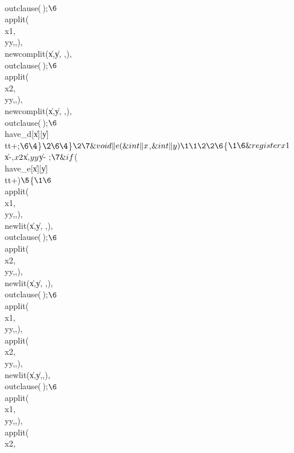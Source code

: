 \\{outclause}(\,);{}$\6
${}\\{applit}(\\{x1},\\{yy},,),\\{newcomplit}(\|x,\|y,%
,),\\{outclause}(\,);{}$\6
${}\\{applit}(\\{x2},\\{yy},,),\\{newcomplit}(\|x,\|y,%
,),\\{outclause}(\,);{}$\6
${}\\{have\_d}[\|x][\|y]\K\\{tt}+;{}$\6
\4${}\}{}$\2\6
\4${}\}{}$\2\7
\&{void} \|e(\&{int} \|x${},$\&{int} \|y)\1\1\2\2\6
${}\{{}$\1\6
\&{register} \\{x1}${}\K\|x-,{}$ \\{x2}${}\K\|x,{}$ \\{yy}${}\K\|y-%
;{}$\7
\&{if} ${}(\\{have\_e}[\|x][\|y]\I\\{tt}+){}$\5
${}\{{}$\1\6
${}\\{applit}(\\{x1},\\{yy},,),\\{newlit}(\|x,\|y,%
,),\\{outclause}(\,);{}$\6
${}\\{applit}(\\{x2},\\{yy},,),\\{newlit}(\|x,\|y,%
,),\\{outclause}(\,);{}$\6
${}\\{applit}(\\{x1},\\{yy},,),\\{applit}(\\{x2},%
\\{yy},,),\\{newlit}(\|x,\|y,,),%
\\{outclause}(\,);{}$\6
${}\\{applit}(\\{x1},\\{yy},,),\\{applit}(\\{x2},%
